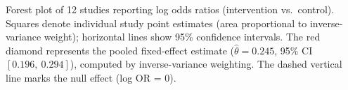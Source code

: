 \caption{Forest plot of 12 studies reporting log odds ratios (intervention vs.\ control).
Squares denote individual study point estimates (area proportional to inverse-variance weight);
horizontal lines show 95\% confidence intervals.
The red diamond represents the pooled fixed-effect estimate
($\hat{\theta} = 0.245$, 95\% CI $[0.196,\ 0.294]$), computed by inverse-variance weighting.
The dashed vertical line marks the null effect (log OR = 0).}

